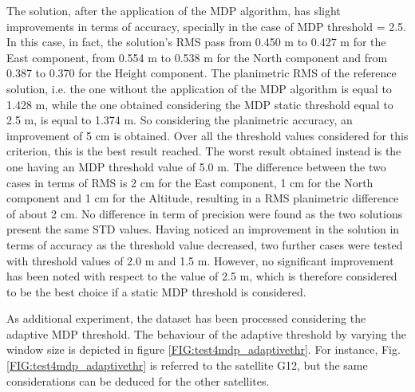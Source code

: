 The solution, after the application of the MDP algorithm, has slight improvements in terms of accuracy, specially in the case of MDP threshold = 2.5. In this case, in fact, the solution's RMS pass from 0.450 m to 0.427 m for the East component, from 0.554 m to 0.538 m for the North component and from 0.387 to 0.370 for the Height component. The planimetric RMS of the reference solution, i.e. the one without the application of the MDP algorithm is equal to 1.428 m, while the one obtained considering the MDP static threshold equal to 2.5 m, is equal to 1.374 m. So considering the planimetric accuracy, an improvement of 5 cm is obtained.
Over all the threshold values considered for this criterion, this is the best result reached. The worst result obtained instead is the one having an MDP threshold value of 5.0 m. The difference between the two cases in terms of RMS is 2 cm for the East component, 1 cm for the North component and 1 cm for the Altitude, resulting in a RMS planimetric difference of about 2 cm. No difference in term of precision were found as the two solutions present the same STD values. 
Having noticed an improvement in the solution in terms of accuracy as the threshold value decreased, two further cases were tested with threshold values of 2.0 m and 1.5 m. However, no significant improvement has been noted with respect to the value of 2.5 m, which is therefore considered to be the best choice if a static MDP threshold is considered. 

As additional experiment, the dataset has  been  processed considering the adaptive MDP threshold. The behaviour of the adaptive threshold by varying the window size  is depicted in figure \ref{FIG:test4mdp_adaptivethr}. For instance, Fig. \ref{FIG:test4mdp_adaptivethr} is referred to the satellite G12, but the same considerations can be deduced for the other satellites.  

